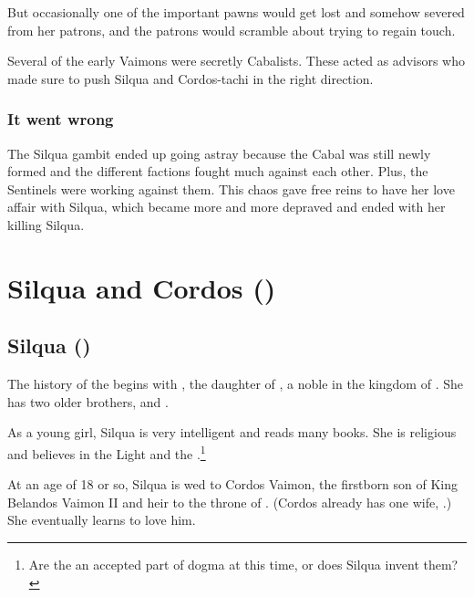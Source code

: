 But occasionally one of the important pawns would get lost and somehow severed from her patrons, and the patrons would scramble about trying to regain touch. 

Several of the early Vaimons were secretly Cabalists. 
These acted as advisors who made sure to push Silqua and Cordos-tachi in the right direction. 





\subsubsection{It went wrong}
The Silqua gambit ended up going astray because the Cabal was still newly formed and the different factions fought much against each other. 
Plus, the Sentinels were working against them. 
This chaos gave \Delphine free reins to have her love affair with Silqua, which became more and more depraved and ended with her killing Silqua. 















\section{Silqua and Cordos ()}









\subsection{Silqua ()}
The history of the \VaimonCaliphate begins with , the daughter of , a noble in the \human{} kingdom of . 
She has two older brothers,  and . 

As a young girl, Silqua is very intelligent and reads many books. 
She is religious and believes in the Light and the \sephiroth.\footnote{Are the \Sephiroth{} an accepted part of dogma at this time, or does Silqua invent them?}

At an age of 18 or so, Silqua is wed to Cordos Vaimon, the firstborn son of King Belandos Vaimon II and heir to the throne of \Imrath. 
(Cordos already has one wife, \Delphine.) 
She eventually learns to love him. 









